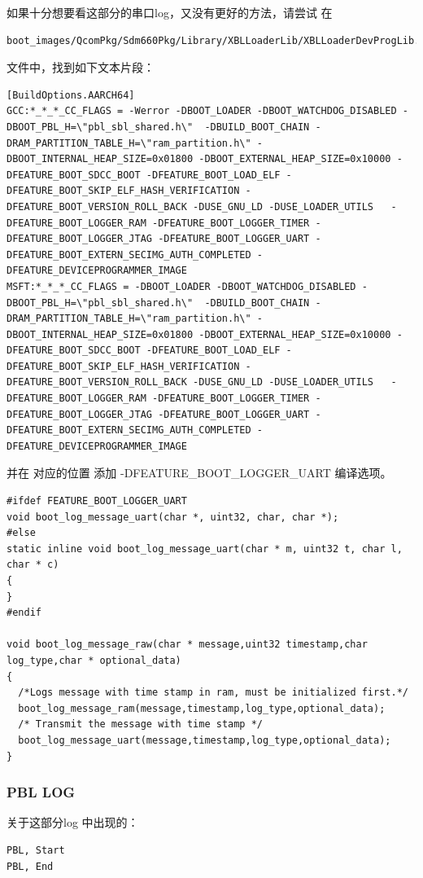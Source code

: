 如果十分想要看这部分的串口log，又没有更好的方法，请尝试
在
\begin{lstlisting}
boot_images/QcomPkg/Sdm660Pkg/Library/XBLLoaderLib/XBLLoaderDevProgLib.inf
\end{lstlisting}
 文件中，找到如下文本片段：
\begin{lstlisting}
[BuildOptions.AARCH64]
GCC:*_*_*_CC_FLAGS = -Werror -DBOOT_LOADER -DBOOT_WATCHDOG_DISABLED -DBOOT_PBL_H=\"pbl_sbl_shared.h\"  -DBUILD_BOOT_CHAIN -DRAM_PARTITION_TABLE_H=\"ram_partition.h\" -DBOOT_INTERNAL_HEAP_SIZE=0x01800 -DBOOT_EXTERNAL_HEAP_SIZE=0x10000 -DFEATURE_BOOT_SDCC_BOOT -DFEATURE_BOOT_LOAD_ELF -DFEATURE_BOOT_SKIP_ELF_HASH_VERIFICATION -DFEATURE_BOOT_VERSION_ROLL_BACK -DUSE_GNU_LD -DUSE_LOADER_UTILS   -DFEATURE_BOOT_LOGGER_RAM -DFEATURE_BOOT_LOGGER_TIMER -DFEATURE_BOOT_LOGGER_JTAG -DFEATURE_BOOT_LOGGER_UART -DFEATURE_BOOT_EXTERN_SECIMG_AUTH_COMPLETED -DFEATURE_DEVICEPROGRAMMER_IMAGE
MSFT:*_*_*_CC_FLAGS = -DBOOT_LOADER -DBOOT_WATCHDOG_DISABLED -DBOOT_PBL_H=\"pbl_sbl_shared.h\"  -DBUILD_BOOT_CHAIN -DRAM_PARTITION_TABLE_H=\"ram_partition.h\" -DBOOT_INTERNAL_HEAP_SIZE=0x01800 -DBOOT_EXTERNAL_HEAP_SIZE=0x10000 -DFEATURE_BOOT_SDCC_BOOT -DFEATURE_BOOT_LOAD_ELF -DFEATURE_BOOT_SKIP_ELF_HASH_VERIFICATION -DFEATURE_BOOT_VERSION_ROLL_BACK -DUSE_GNU_LD -DUSE_LOADER_UTILS   -DFEATURE_BOOT_LOGGER_RAM -DFEATURE_BOOT_LOGGER_TIMER -DFEATURE_BOOT_LOGGER_JTAG -DFEATURE_BOOT_LOGGER_UART -DFEATURE_BOOT_EXTERN_SECIMG_AUTH_COMPLETED -DFEATURE_DEVICEPROGRAMMER_IMAGE
\end{lstlisting}
并在 对应的位置 添加 -DFEATURE\_BOOT\_LOGGER\_UART 编译选项。
\begin{lstlisting}
#ifdef FEATURE_BOOT_LOGGER_UART
void boot_log_message_uart(char *, uint32, char, char *);
#else
static inline void boot_log_message_uart(char * m, uint32 t, char l, char * c)
{
}
#endif

void boot_log_message_raw(char * message,uint32 timestamp,char log_type,char * optional_data)
{
  /*Logs message with time stamp in ram, must be initialized first.*/
  boot_log_message_ram(message,timestamp,log_type,optional_data);
  /* Transmit the message with time stamp */
  boot_log_message_uart(message,timestamp,log_type,optional_data);
}
\end{lstlisting}


\subsubsection{PBL LOG}
关于这部分log 中出现的： 
\begin{lstlisting}
PBL, Start
PBL, End
\end{lstlisting}

